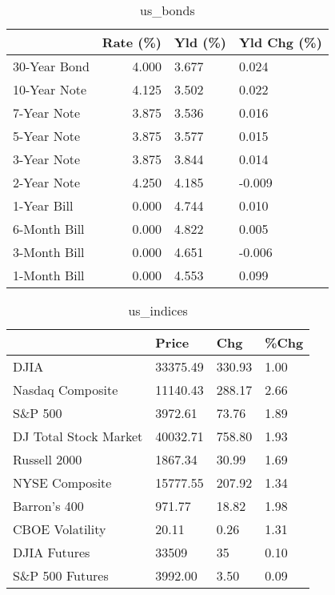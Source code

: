 \documentclass{article}%
\begin{document}
%


\begin{table}[htbp]%
\caption{us\_bonds}%
\centering%
\begin{adjustbox}{width=1\textwidth}%
\begin{tabular}{lrll}
\toprule
             &  Rate (\%) & Yld (\%) & Yld Chg (\%) \\
\midrule
30-Year Bond &     4.000 &   3.677 &       0.024 \\
10-Year Note &     4.125 &   3.502 &       0.022 \\
 7-Year Note &     3.875 &   3.536 &       0.016 \\
 5-Year Note &     3.875 &   3.577 &       0.015 \\
 3-Year Note &     3.875 &   3.844 &       0.014 \\
 2-Year Note &     4.250 &   4.185 &      -0.009 \\
 1-Year Bill &     0.000 &   4.744 &       0.010 \\
6-Month Bill &     0.000 &   4.822 &       0.005 \\
3-Month Bill &     0.000 &   4.651 &      -0.006 \\
1-Month Bill &     0.000 &   4.553 &       0.099 \\
\bottomrule
\end{tabular}
%
\end{adjustbox}%
\end{table}

%


\begin{table}[htbp]%
\caption{us\_indices}%
\centering%
\begin{adjustbox}{width=1\textwidth}%
\begin{tabular}{llll}
\toprule
                      &    Price &    Chg & \%Chg \\
\midrule
                 DJIA & 33375.49 & 330.93 & 1.00 \\
     Nasdaq Composite & 11140.43 & 288.17 & 2.66 \\
              S\&P 500 &  3972.61 &  73.76 & 1.89 \\
DJ Total Stock Market & 40032.71 & 758.80 & 1.93 \\
         Russell 2000 &  1867.34 &  30.99 & 1.69 \\
       NYSE Composite & 15777.55 & 207.92 & 1.34 \\
         Barron's 400 &   971.77 &  18.82 & 1.98 \\
      CBOE Volatility &    20.11 &   0.26 & 1.31 \\
         DJIA Futures &    33509 &     35 & 0.10 \\
      S\&P 500 Futures &  3992.00 &   3.50 & 0.09 \\
\bottomrule
\end{tabular}
%
\end{adjustbox}%
\end{table}
\end{document}
